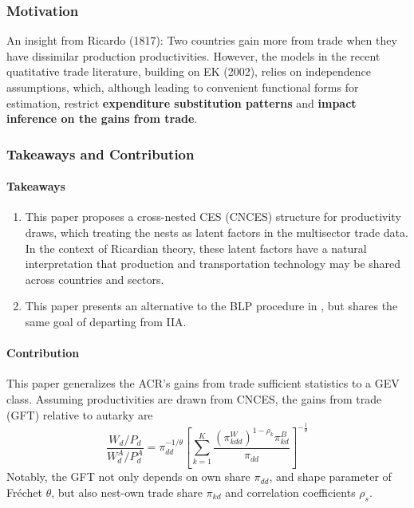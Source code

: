 \subsubsection{Motivation}
An insight from Ricardo (1817):
Two countries gain more from trade when they have dissimilar production productivities.
However, the models in the recent quatitative trade literature, building on EK (2002), relies on independence assumptions,
which, although leading to convenient functional forms for estimation,
restrict \textbf{expenditure substitution patterns} and 
\textbf{impact inference on the gains from trade}.

\subsubsection{Takeaways and Contribution}
\paragraph{Takeaways}
\begin{enumerate}
    \item This paper proposes a cross-nested CES (CNCES) structure for productivity draws, 
    which treating the nests as latent factors in the multisector trade data.
    In the context of Ricardian theory, 
    these latent factors have a natural interpretation 
    that production and transportation technology may be shared across countries and sectors.
    \item This paper presents an alternative to the BLP procedure in \citep{Adao:2017}, but shares the same
    goal of departing from IIA.
\end{enumerate}

\paragraph{Contribution}
This paper generalizes the ACR's gains from trade sufficient statistics to a GEV class.
Assuming productivities are drawn from CNCES, the gains from trade (GFT) relative to autarky are
\begin{equation}
\frac{W_d / P_d}{W_d^A / P_d^A}=\pi_{d d}^{-1 / \theta}\left[\sum_{k=1}^K \frac{\left(\pi_{k d d}^W\right)^{1-\rho_k} \pi_{k d}^B}{\pi_{d d}}\right]^{-\frac{1}{\theta}}
\end{equation}
Notably, the GFT not only depends on own share $\pi_{dd}$, and shape parameter of Fr\'{e}chet $\theta$,
but also nest-own trade share $\pi_{kd}$ and correlation coefficients $\rho_s$.

